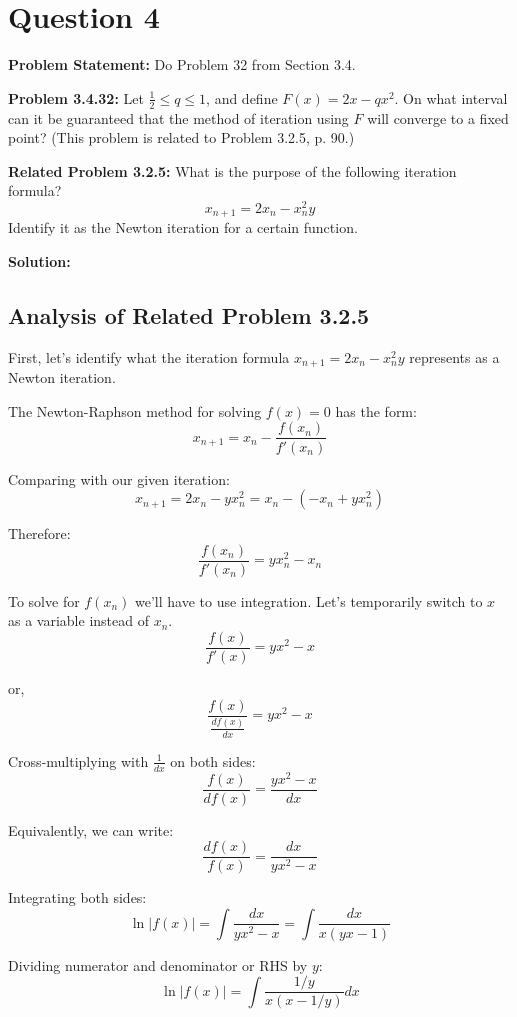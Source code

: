 \clearpage
\section*{Question 4}

\textbf{Problem Statement:} Do Problem 32 from Section 3.4.

\textbf{Problem 3.4.32:} Let $\frac{1}{2} \leq q \leq 1$, and define $F(x) = 2x - qx^2$. On what interval can it be guaranteed that the method of iteration using $F$ will converge to a fixed point? (This problem is related to Problem 3.2.5, p. 90.)

\textbf{Related Problem 3.2.5:} What is the purpose of the following iteration formula?
$$x_{n+1} = 2x_n - x_n^2 y$$
Identify it as the Newton iteration for a certain function.

\vspace{1em}

\textbf{Solution:}

\subsection*{Analysis of Related Problem 3.2.5}

First, let's identify what the iteration formula $x_{n+1} = 2x_n - x_n^2 y$ represents as a Newton iteration.

The Newton-Raphson method for solving $f(x) = 0$ has the form:
$$x_{n+1} = x_n - \frac{f(x_n)}{f'(x_n)}$$

Comparing with our given iteration:
$$x_{n+1} = 2x_n - yx_n^2 = x_n - (-x_n + yx_n^2)$$

Therefore:
$$\frac{f(x_n)}{f'(x_n)} = yx_n^2 - x_n$$

To solve for $f(x_n)$ we'll have to use integration. Let's temporarily switch to $x$ as a variable instead of $x_n$.
$$\frac{f(x)}{f'(x)} = yx^2 - x$$

or,
$$\frac{f(x)}{\frac{df(x)}{dx}} = yx^2 - x$$

Cross-multiplying with $\frac{1}{dx}$ on both sides:
$$\frac{f(x)}{df(x)} = \frac{yx^2 -x}{dx}$$

Equivalently, we can write:
$$\frac{df(x)}{f(x)} = \frac{dx}{yx^2 - x}$$

Integrating both sides:
$$\ln|f(x)| = \int \frac{dx}{yx^2 - x} = \int \frac{dx}{x(yx - 1)}$$

Dividing numerator and denominator or RHS by $y$:
$$\ln|f(x)| = \int \frac{1/y}{x(x - 1/y)} dx$$


